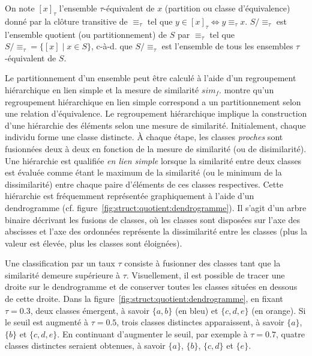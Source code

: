 \begin{definition}
    On note $[x]_\tau$ l'ensemble $\tau$-équivalent de $x$ (partition ou classe d'équivalence) donné par la clôture transitive de $\equiv_\tau$ tel que $y \in [x]_\tau \iff y \equiv_\tau x$.
    $S/\equiv_\tau$ est l'ensemble quotient (ou partitionnement) de $S$ par $\equiv_\tau$ tel que $S/\equiv_\tau = \{[x] \mid x \in S\}$, c-à-d. que $S/\equiv_\tau$ est l'ensemble de tous les ensembles $\tau$-équivalent de $S$.
\end{definition}

Le partitionnement d'un ensemble peut être calculé à l'aide d'un regroupement hiérarchique en lien simple et la mesure de similarité $sim_f$.
\cite{carlssonCharacterizationStabilityConvergence2010} montre qu'un regroupement hiérarchique en lien simple correspond a un partitionnement selon une relation d'équivalence.
Le regroupement hiérarchique implique la construction d'une hiérarchie des éléments selon une mesure de similarité.
Initialement, chaque individu forme une classe distincte.
À chaque étape, les classes \emph{proches} sont fusionnées deux à deux en fonction de la mesure de similarité (ou de disimilarité).
Une hiérarchie est qualifiée \emph{en lien simple} lorsque la similarité entre deux classes est évaluée comme étant le maximum de la similarité (ou le minimum de la dissimilarité) entre chaque paire d'éléments de ces classes respectives.
Cette hiérarchie est fréquemment représentée graphiquement à l'aide d'un dendrogramme (cf. figure~\ref{fig:struct:quotient:dendrogramme}).
Il s'agit d'un arbre binaire décrivant les fusions de classes, où les classes sont disposées sur l'axe des abscisses et l'axe des ordonnées représente la dissimilarité entre les classes (plus la valeur est élevée, plus les classes sont éloignées).

Une classification par un taux $\tau$ consiste à fusionner des classes tant que la similarité demeure supérieure à $\tau$.
Visuellement, il est possible de tracer une droite sur le dendrogramme et de conserver toutes les classes situées en dessous de cette droite.
Dans la figure~\ref{fig:struct:quotient:dendrogramme}, en fixant $\tau = 0.3$, deux classes émergent, à savoir $\{a, b\}$ (en bleu) et $\{c, d, e\}$ (en orange).
Si le seuil est augmenté à $\tau = 0.5$, trois classes distinctes apparaissent, à savoir $\{a\}$, $\{b\}$ et $\{c, d, e\}$.
En continuant d'augmenter le seuil, par exemple à $\tau = 0.7$, quatre classes distinctes seraient obtenues, à savoir $\{a\}$, $\{b\}$, $\{c, d\}$ et $\{e\}$.

